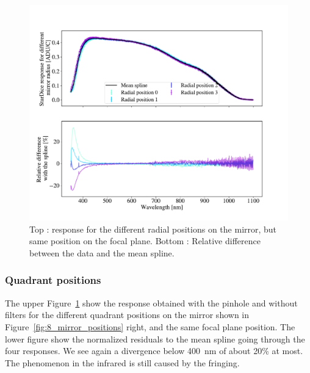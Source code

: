 \begin{figure}[h]
    \centering
    \includegraphics[width=\columnwidth]{fig/radial_positions.pdf}
    \caption{Top : \SD response for the different radial positions on the mirror, but same position on the focal plane. Bottom : Relative difference between the data and the mean spline.}
    \label{fig:radial_positions}
\end{figure}

\subsubsection{Quadrant positions}

The upper Figure~\ref{fig:radial_positions} show the \SD response obtained with the \spinhole pinhole and without filters for the different quadrant positions on the mirror shown in Figure~\ref{fig:8_mirror_positions} right, and the same focal plane position. The lower figure show the normalized residuals to the mean spline going through the four responses. We see again a divergence below \SI{400}{\nm} of about 20\% at most. The phenomenon in the infrared is still caused by the fringing. 

